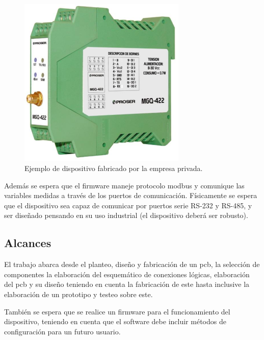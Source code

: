 \begin{figure}[h]
	\centering
	\includegraphics[width=80mm,keepaspectratio]{Figures/dispositivo_empresa.png}
	\caption{Ejemplo de dispositivo fabricado por la empresa privada.}
	\label{fig:disp_emp}
\end{figure}

Además se espera que el firmware maneje protocolo modbus y comunique las variables medidas a través de los puertos de comunicación. Físicamente se espera que el dispositivo sea capaz de comunicar por puertos serie RS-232 y RS-485, y ser diseñado pensando en su uso industrial (el dispositivo deberá ser robusto).


\subsection{Alcances}



El trabajo abarca desde el planteo, diseño y fabricación de un pcb, la selección de componentes la elaboración del esquemático de conexiones lógicas, elaboración del pcb y su diseño teniendo en cuenta la fabricación de este hasta inclusive la elaboración de un prototipo y testeo sobre este.

También se espera que se  realice un firmware para el funcionamiento del dispositivo, teniendo en cuenta que el software debe incluir métodos de configuración para un futuro usuario.





